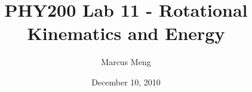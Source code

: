 \title{PHY200 Lab 11 - Rotational Kinematics and Energy}

\author{Marcus Meng}

\date{December 10, 2010}

